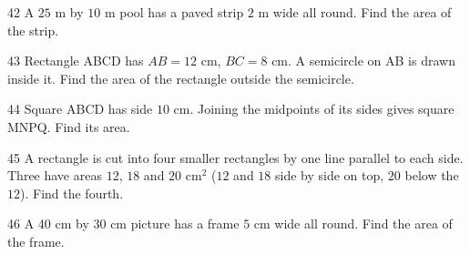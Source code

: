 \gap
\begin{probbox}{42}{}
A $25$ m by $10$ m pool has a paved strip $2$ m wide all round. Find the area of the strip.
\end{probbox}
\gap
\begin{probbox}{43}{}
Rectangle ABCD has $AB=12$ cm, $BC=8$ cm. A semicircle on AB is drawn inside it. Find the area of the rectangle outside the semicircle.
\end{probbox}
\gap
\begin{probbox}{44}{}
Square ABCD has side $10$ cm. Joining the midpoints of its sides gives square MNPQ. Find its area.
\end{probbox}
\gap
\begin{probbox}{45}{}
A rectangle is cut into four smaller rectangles by one line parallel to each side. Three have areas $12$, $18$ and $20$ cm$^2$ ($12$ and $18$ side by side on top, $20$ below the $12$). Find the fourth.
\end{probbox}
\gap
\begin{probbox}{46}{}
A $40$ cm by $30$ cm picture has a frame $5$ cm wide all round. Find the area of the frame.
\end{probbox}
